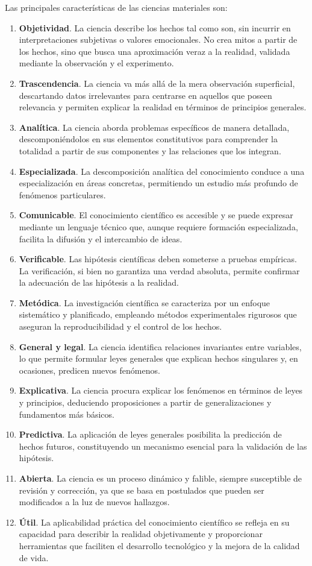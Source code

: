 Las principales características de las ciencias materiales son:
\begin{enumerate}
    \item \textbf{Objetividad}. La ciencia describe los hechos tal como son, sin incurrir en interpretaciones subjetivas o valores emocionales. No crea mitos a partir de los hechos, sino que busca una aproximación veraz a la realidad, validada mediante la observación y el experimento.
    \item \textbf{Trascendencia}. La ciencia va más allá de la mera observación superficial, descartando datos irrelevantes para centrarse en aquellos que poseen relevancia y permiten explicar la realidad en términos de principios generales.
    \item \textbf{Analítica}. La ciencia aborda problemas específicos de manera detallada, descomponiéndolos en sus elementos constitutivos para comprender la totalidad a partir de sus componentes y las relaciones que los integran.
    \item \textbf{Especializada}. La descomposición analítica del conocimiento conduce a una especialización en áreas concretas, permitiendo un estudio más profundo de fenómenos particulares.
    \item \textbf{Comunicable}. El conocimiento científico es accesible y se puede expresar mediante un lenguaje técnico que, aunque requiere formación especializada, facilita la difusión y el intercambio de ideas.
    \item \textbf{Verificable}. Las hipótesis científicas deben someterse a pruebas empíricas. La verificación, si bien no garantiza una verdad absoluta, permite confirmar la adecuación de las hipótesis a la realidad.
    \item \textbf{Metódica}. La investigación científica se caracteriza por un enfoque sistemático y planificado, empleando métodos experimentales rigurosos que aseguran la reproducibilidad y el control de los hechos.
    \item \textbf{General y legal}. La ciencia identifica relaciones invariantes entre variables, lo que permite formular leyes generales que explican hechos singulares y, en ocasiones, predicen nuevos fenómenos.
    \item \textbf{Explicativa}. La ciencia procura explicar los fenómenos en términos de leyes y principios, deduciendo proposiciones a partir de generalizaciones y fundamentos más básicos.
    \item \textbf{Predictiva}. La aplicación de leyes generales posibilita la predicción de hechos futuros, constituyendo un mecanismo esencial para la validación de las hipótesis.
    \item \textbf{Abierta}. La ciencia es un proceso dinámico y falible, siempre susceptible de revisión y corrección, ya que se basa en postulados que pueden ser modificados a la luz de nuevos hallazgos.
    \item \textbf{Útil}. La aplicabilidad práctica del conocimiento científico se refleja en su capacidad para describir la realidad objetivamente y proporcionar herramientas que faciliten el desarrollo tecnológico y la mejora de la calidad de vida.
\end{enumerate}

